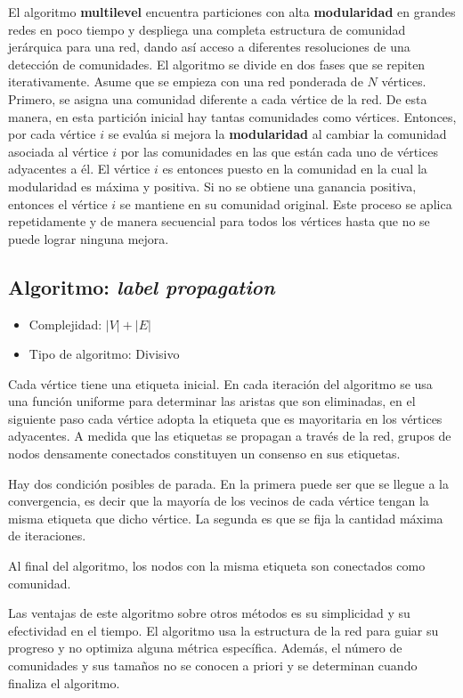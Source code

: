 El algoritmo \textbf{multilevel} encuentra particiones con alta \textbf{modularidad} en grandes redes en poco tiempo y despliega una completa estructura de comunidad jerárquica para una red, dando así acceso a diferentes resoluciones de una detección de comunidades. El algoritmo se divide en dos fases que se repiten iterativamente. Asume que se empieza con una red ponderada de $N$ vértices. Primero, se asigna una comunidad diferente a cada vértice de la red. De esta manera, en esta partición inicial hay tantas comunidades como vértices. Entonces, por cada vértice $i$ se evalúa si mejora la \textbf{modularidad} al cambiar la comunidad asociada al vértice $i$ por las comunidades en las que están cada uno de vértices adyacentes a él. El vértice $i$ es entonces puesto en la comunidad en la cual la modularidad es máxima y positiva. Si no se obtiene una ganancia positiva, entonces el vértice $i$ se mantiene en su comunidad original. Este proceso se aplica repetidamente y de manera secuencial para todos los vértices hasta que no se puede lograr ninguna mejora.
 
\subsection{Algoritmo: \textit{label propagation}}\cite{Raghavan2007NearNetworks.}
\begin{itemize}
\item Complejidad: $|V| + |E|$
\item Tipo de algoritmo: Divisivo
\end{itemize}
Cada vértice tiene una etiqueta inicial. En cada iteración del algoritmo se usa una función uniforme para determinar las aristas que son eliminadas, en el siguiente paso cada vértice adopta la etiqueta que es mayoritaria en los vértices adyacentes. A medida que las etiquetas se propagan a través de la red, grupos de nodos densamente conectados constituyen un consenso en sus etiquetas. 

Hay dos condición posibles de parada. En la primera puede ser que se llegue a la convergencia, es decir que la mayoría de los vecinos de cada vértice tengan la misma etiqueta que dicho vértice. La segunda es que se fija la cantidad máxima de iteraciones. 

Al final del algoritmo, los nodos con la misma etiqueta son conectados como comunidad. 

Las ventajas de este algoritmo sobre otros métodos es su simplicidad y su efectividad en el tiempo. El algoritmo usa la estructura de la red para guiar su progreso y no optimiza alguna métrica específica. Además, el número de comunidades y sus tamaños no se conocen a priori y se determinan cuando finaliza el algoritmo.
 
